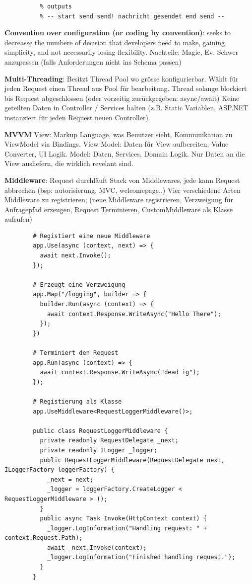 \documentclass[10pt,landscape]{article}
\begin{document}
\begin{multicols}{2}
\begin{lstlisting}
          % outputs
          % -- start send send! nachricht gesendet end send -- 
        \end{lstlisting}

        \textbf{Convention over configuration (or coding by convention)}: seeks to decreasse the numbere of decision that developers need to make, gaining simplicity, and not necessarily losing flexibility.
        Nachteile: Magie, Ev. Schwer anzupassen (falls Anforderungen nicht ins Schema passen)

        \textbf{Multi-Threading}: Besitzt Thread Pool wo grösse konfigurierbar. Wählt für jeden Request einen Thread aus Pool für bearbeitung.
        Thread solange blockiert bis Request abgeschlossen (oder vorzeitig zurückgegeben: async/await)
        Keine geteilten Daten in Controller / Services halten (z.B. Static Variablen, ASP.NET instanziert für jeden Request neuen Controller)

        \textbf{MVVM} View: Markup Language, was Benutzer sieht, Kommunikation zu ViewModel via Bindings.
        View Model: Daten für View aufbereiten, Value Converter, UI Logik. Model: Daten, Services, Domain Logik.
        Nur Daten an die View ausliefern, die wirklich revelant sind.

        \textbf{Middleware}: Request durchläuft Stack von Middlewares, jede kann Request abbrechen (bsp: autorisierung, MVC, welcomepage..)
        Vier verschiedene Arten Middleware zu registrieren; (neue Middleware registrieren, Verzweigung für Anfragepfad erzeugen, Request Terminieren, CustomMiddleware als Klasse aufrufen)

        \begin{lstlisting}
        # Registiert eine neue Middleware
        app.Use(async (context, next) => {
          await next.Invoke();
        });

        # Erzeugt eine Verzweigung
        app.Map("/logging", builder => {
          builder.Run(async (context) => {
            await context.Response.WriteAsync("Hello There");
          });
        })

        # Terminiert den Request
        app.Run(async (context) => {
          await context.Response.WriteAsync("dead ig");
        });

        # Registierung als Klasse
        app.UseMiddleware<RequestLoggerMiddleware()>;

        public class RequestLoggerMiddleware {
          private readonly RequestDelegate _next;
          private readonly ILogger _logger;
          public RequestLoggerMiddleware(RequestDelegate next, ILoggerFactory loggerFactory) {
            _next = next;
            _logger = loggerFactory.CreateLogger < RequestLoggerMiddleware > ();
          }
          public async Task Invoke(HttpContext context) {
            _logger.LogInformation("Handling request: " + context.Request.Path);
            await _next.Invoke(context);
            _logger.LogInformation("Finished handling request.");
          }
        }
        \end{lstlisting}


\end{multicols}
\end{document}
